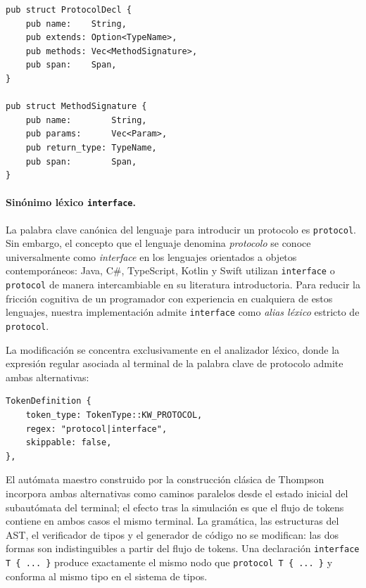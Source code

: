 \documentclass[11pt,a4paper,oneside,openany]{report}
\newcommand{\code}[1]{\texttt{#1}}
\begin{document}
\begin{lstlisting}[style=rustst, caption={Representación AST de una declaración de protocolo.}, label={lst:ast-protocol}]
pub struct ProtocolDecl {
    pub name:    String,
    pub extends: Option<TypeName>,
    pub methods: Vec<MethodSignature>,
    pub span:    Span,
}

pub struct MethodSignature {
    pub name:        String,
    pub params:      Vec<Param>,
    pub return_type: TypeName,
    pub span:        Span,
}
\end{lstlisting}

\paragraph{Sinónimo léxico \code{interface}.}
La palabra clave canónica del lenguaje para introducir un protocolo es
\code{protocol}. Sin embargo, el concepto que el lenguaje denomina
\emph{protocolo} se conoce universalmente como \emph{interface} en los
lenguajes orientados a objetos contemporáneos: Java, C\#, TypeScript, Kotlin
y Swift utilizan \code{interface} o \code{protocol} de manera intercambiable
en su literatura introductoria. Para reducir la fricción cognitiva de un
programador con experiencia en cualquiera de estos lenguajes, nuestra
implementación admite \code{interface} como \emph{alias léxico} estricto de
\code{protocol}.

La modificación se concentra exclusivamente en el analizador léxico, donde
la expresión regular asociada al terminal de la palabra clave de protocolo
admite ambas alternativas:

\begin{lstlisting}[style=rustst, caption={Alias léxico para el terminal de protocolo.}]
TokenDefinition {
    token_type: TokenType::KW_PROTOCOL,
    regex: "protocol|interface",
    skippable: false,
},
\end{lstlisting}

El autómata maestro construido por la construcción clásica de
Thompson~\cite{thompson1968} incorpora ambas alternativas como caminos
paralelos desde el estado inicial del subautómata del terminal; el efecto
tras la simulación es que el flujo de tokens contiene en ambos casos el
mismo terminal. La gramática, las estructuras del AST, el verificador de
tipos y el generador de código no se modifican: las dos formas son
indistinguibles a partir del flujo de tokens. Una declaración
\code{interface T \{ ... \}} produce exactamente el mismo nodo que
\code{protocol T \{ ... \}} y conforma al mismo tipo en el sistema de
tipos.
\end{document}
